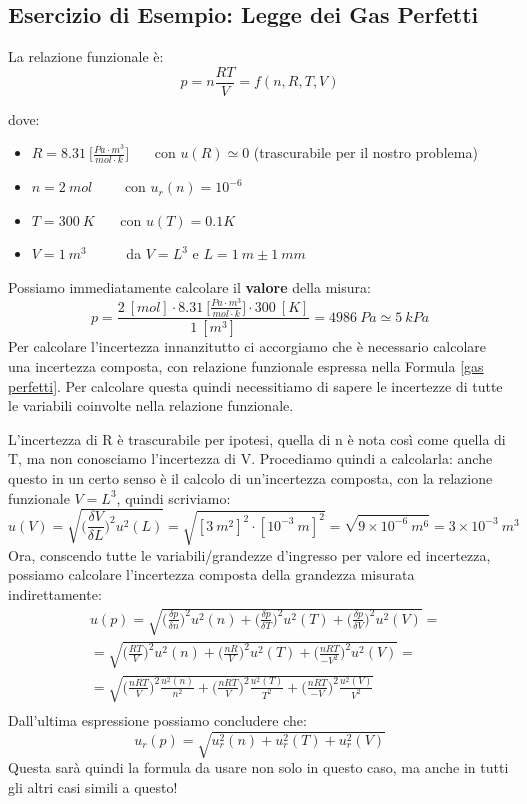 \documentclass[a4paper,11pt]{report}
\begin{document}
\subsection{Esercizio di Esempio: Legge dei Gas Perfetti}
La relazione funzionale è:
\begin{equation}
  \label{gas perfetti}
  p = n \frac{RT}{V} = f (n,R,T,V)
\end{equation}

dove:
\begin{itemize}
  \item $R = 8.31~\Bigg[\frac{Pa\cdot m^3}{mol\cdot k}\Bigg]$~~~ con $u(R) \simeq 0$ (trascurabile per il nostro problema)
  \item $n = 2~mol$~~~~ con $u_r(n) = 10^{-6}$
  \item $T = 300~K$~~~ con $u(T) = 0.1 K$
  \item $V = 1~m^3$~~~~~ da $V = L^3$ e $L = 1~m\pm 1~mm$
\end{itemize}
Possiamo immediatamente calcolare il \textbf{valore} della misura:
$$
  p = \frac{2~[mol]\cdot 8.31~\Bigg[\frac{Pa\cdot m^3}{mol\cdot k}\Bigg]\cdot 300~[K]}{1~[m^3]} = 4986~Pa \simeq 5~kPa
$$
Per calcolare l'incertezza innanzitutto ci accorgiamo che è necessario calcolare una incertezza composta, con relazione funzionale espressa nella Formula \ref{gas perfetti}. Per calcolare questa quindi necessitiamo di sapere le incertezze di tutte le variabili coinvolte nella relazione funzionale.

L'incertezza di R è trascurabile per ipotesi, quella di n è nota così come quella di T, ma non conosciamo l'incertezza di V. Procediamo quindi a calcolarla: anche questo in un certo senso è il calcolo di un'incertezza composta, con la relazione funzionale $ V = L^3 $, quindi scriviamo:
$$
  u(V) = \sqrt{\Bigg(\frac{\delta V}{\delta L}\Bigg)^2 u^2(L)} = \sqrt{[3~m^2]^2\cdot[10^{-3}~m]^2} = \sqrt{9\times 10^{-6}~m^6} = 3\times 10^{-3}~ m^3
$$
Ora, conscendo tutte le variabili/grandezze d'ingresso per valore ed incertezza, possiamo calcolare l'incertezza composta della grandezza misurata indirettamente:
\begin{align*}
&u(p) = \sqrt{\Bigg(\frac{\delta p}{\delta n}\Bigg)^2 u^2(n)+\Bigg(\frac{\delta p}{\delta T}\Bigg)^2 u^2(T)+\Bigg(\frac{\delta p}{\delta V}\Bigg)^2 u^2(V)} =\\
&= \sqrt{\Bigg(\frac{RT}{V}\Bigg)^2 u^2(n)+\Bigg(\frac{nR}{V}\Bigg)^2 u^2(T)+\Bigg(\frac{nRT}{-V^2}\Bigg)^2 u^2(V)} =\\
&= \sqrt{\Bigg(\frac{nRT}{V}\Bigg)^2 \frac{u^2(n)}{n^2}+\Bigg(\frac{nRT}{V}\Bigg)^2 \frac{u^2(T)}{T^2}+\Bigg(\frac{nRT}{-V}\Bigg)^2 \frac{u^2(V)}{V^2}}\\
\end{align*}
Dall'ultima espressione possiamo concludere che:
\begin{equation}
\label{formula incertezza composta}
  u_r(p) = \sqrt{u_r^2(n)+u_r^2(T)+u_r^2(V)}
\end{equation}
Questa sarà quindi la formula da usare non solo in questo caso, ma anche in tutti gli altri casi simili a questo!
\end{document}
